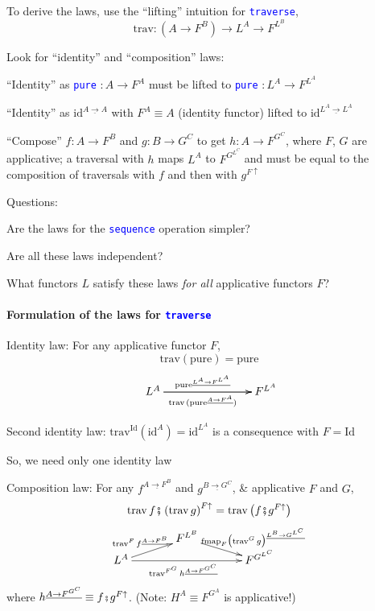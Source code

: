 To derive the laws, use the ``lifting'' intuition for \texttt{\textcolor{blue}{\footnotesize{}traverse}},{\footnotesize{}
\[
\text{trav}:(A\rightarrow F^{B})\rightarrow L^{A}\rightarrow F^{L^{B}}
\]
}{\footnotesize\par}

{\footnotesize{}L}ook for ``identity'' and ``composition'' laws:

``Identity'' as \texttt{\textcolor{blue}{\footnotesize{}pure}} $:A\rightarrow F^{A}$
must be lifted to \texttt{\textcolor{blue}{\footnotesize{}pure}} $:L^{A}\rightarrow F^{L^{A}}$

``Identity'' as $\text{id}^{\underline{A\rightarrow A}}$ with $F^{A}\equiv A$
(identity functor) lifted to $\text{id}^{\underline{L^{A}\rightarrow L^{A}}}$

``Compose'' $f:A\rightarrow F^{B}$ and $g:B\rightarrow G^{C}$
to get $h:A\rightarrow F^{G^{C}}$, where $F$, $G$ are applicative;
a traversal with $h$ maps $L^{A}$ to $F^{G^{L^{C}}}$ and must be
equal to the composition of traversals with $f$ and then with $g^{F\uparrow}$

Questions:

Are the laws for the \texttt{\textcolor{blue}{\footnotesize{}sequence}}
operation simpler?

Are all these laws independent?

What functors $L$ satisfy these laws \emph{for all} applicative functors
$F$?


\paragraph{Formulation of the laws for \texttt{\textcolor{blue}{\footnotesize{}traverse}} }

\vspace{-0.15cm}Identity law: For any applicative functor $F$, 
\[
\text{trav}\left(\text{pure}\right)=\text{pure}
\]
\[
\xymatrix{\xyScaleY{0.2pc}\xyScaleX{3pc}\ L^{A}\ar[rr]\sp(0.45){\text{pure}^{\underline{L^{A}\rightarrow F^{L^{A}}}}}\ar[rr]\sb(0.45){\text{trav}\,(\text{pure}^{\underline{A\rightarrow F^{A}}})} &  & F^{L^{A}}}
\]

Second identity law: $\text{trav}^{\text{Id}}(\text{id}^{A})=\text{id}^{L^{A}}$
is a consequence with $F=\text{Id}$

So, we need only one identity law

Composition law: For any $f^{\underline{A\rightarrow F^{B}}}$ and
$g^{\underline{B\rightarrow G^{C}}}$, \& applicative $F$ and $G$,
\[
\text{trav}\,f\bef\left(\text{trav}\,g\right)^{F\uparrow}=\text{trav}\,\big(f\bef g^{F\uparrow}\big)
\]
\[
\xymatrix{\xyScaleY{0.2pc}\xyScaleX{3pc} & F^{L^{B}}\ar[rd]\sp(0.55){\ \ \ \ \text{fmap}_{F}\big(\text{trav}^{G}\,g\big)^{\underline{L^{B}\rightarrow G^{L^{C}}}}}\\
L^{A}\ar[ru]\sp(0.45){\text{trav}^{F}\,f^{\underline{A\rightarrow F^{B}}}}\ar[rr]\sb(0.45){\text{trav}^{F^{G}}\,h^{\underline{A\rightarrow F^{G^{C}}}}} &  & F^{G^{L^{C}}}
}
\]
where $h^{\underline{A\rightarrow F^{G^{C}}}}\equiv f\bef g^{F\uparrow}$.
(Note: $H^{A}\equiv F^{G^{A}}$ is applicative!)


